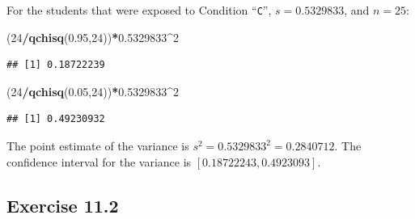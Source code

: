 \documentclass[]{krantz}
\makeatletter
\newenvironment{Shaded}{\begin{snugshade}}{\end{snugshade}}
\newcommand{\KeywordTok}[1]{\textcolor[rgb]{0.13,0.29,0.53}{\textbf{#1}}}
\newcommand{\DecValTok}[1]{\textcolor[rgb]{0.00,0.00,0.81}{#1}}
\newcommand{\FloatTok}[1]{\textcolor[rgb]{0.00,0.00,0.81}{#1}}
\newcommand{\OperatorTok}[1]{\textcolor[rgb]{0.81,0.36,0.00}{\textbf{#1}}}
\newcommand{\NormalTok}[1]{#1}
\newenvironment{kframe}{%
\medskip{}
\setlength{\fboxsep}{.8em}
 \def\at@end@of@kframe{}%
 \ifinner\ifhmode%
  \def\at@end@of@kframe{\end{minipage}}%
  \begin{minipage}{\columnwidth}%
 \fi\fi%
 \def\FrameCommand##1{\hskip\@totalleftmargin \hskip-\fboxsep
 \colorbox{shadecolor}{##1}\hskip-\fboxsep
     \hskip-\linewidth \hskip-\@totalleftmargin \hskip\columnwidth}%
 \MakeFramed {\advance\hsize-\width
   \@totalleftmargin\z@ \linewidth\hsize
   \@setminipage}}%
 {\par\unskip\endMakeFramed%
 \at@end@of@kframe}
\renewenvironment{Shaded}{\begin{kframe}}{\end{kframe}}
\theoremstyle{definition}
\theoremstyle{definition}
\theoremstyle{definition}
\theoremstyle{remark}
\makeatother
\begin{document}
\begin{enumerate}
  For the students that were exposed to Condition ``\texttt{C}'',
  \(s = 0.5329833\), and \(n = 25\):

\begin{Shaded}
\begin{Highlighting}[]
\NormalTok{(}\DecValTok{24}\OperatorTok{/}\KeywordTok{qchisq}\NormalTok{(}\FloatTok{0.95}\NormalTok{,}\DecValTok{24}\NormalTok{))}\OperatorTok{*}\FloatTok{0.5329833}\OperatorTok{^}\DecValTok{2}
\end{Highlighting}
\end{Shaded}

\begin{verbatim}
## [1] 0.18722239
\end{verbatim}

\begin{Shaded}
\begin{Highlighting}[]
\NormalTok{(}\DecValTok{24}\OperatorTok{/}\KeywordTok{qchisq}\NormalTok{(}\FloatTok{0.05}\NormalTok{,}\DecValTok{24}\NormalTok{))}\OperatorTok{*}\FloatTok{0.5329833}\OperatorTok{^}\DecValTok{2}
\end{Highlighting}
\end{Shaded}

\begin{verbatim}
## [1] 0.49230932
\end{verbatim}

  The point estimate of the variance is
  \(s^2 = 0.5329833^2 = 0.2840712\). The confidence interval for the
  variance is \([0.18722243, 0.4923093]\).
\end{enumerate}

\subsection*{Exercise 11.2}\label{exercise-11.2}
\end{document}
